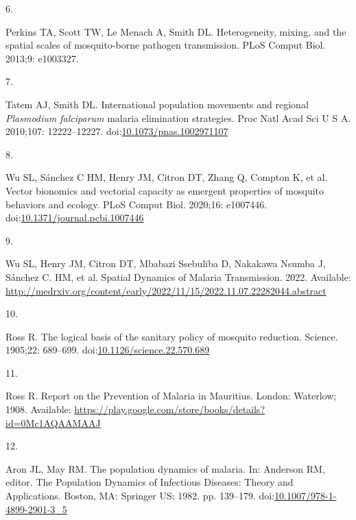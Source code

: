 \documentclass[
]{book}
\newlength{\cslhangindent}
\newlength{\csllabelwidth}
\newlength{\cslentryspacingunit} %
\newenvironment{CSLReferences}[2] %
 {%
  \setlength{\parindent}{0pt}
  \ifodd #1
  \let\oldpar\par
  \def\par{\hangindent=\cslhangindent\oldpar}
  \fi
  \setlength{\parskip}{#2\cslentryspacingunit}
 }%
 {}
\newcommand{\CSLLeftMargin}[1]{\parbox[t]{\csllabelwidth}{#1}}
\newcommand{\CSLRightInline}[1]{\parbox[t]{\linewidth - \csllabelwidth}{#1}\break}
\begin{document}
\begin{CSLReferences}{0}{0}
\leavevmode{}%
\CSLLeftMargin{6. }%
\CSLRightInline{Perkins TA, Scott TW, Le Menach A, Smith DL. Heterogeneity, mixing, and the spatial scales of mosquito-borne pathogen transmission. PLoS Comput Biol. 2013;9: e1003327. }

\leavevmode{}%
\CSLLeftMargin{7. }%
\CSLRightInline{Tatem AJ, Smith DL. International population movements and regional \emph{{Plasmodium} falciparum} malaria elimination strategies. Proc Natl Acad Sci U S A. 2010;107: 12222--12227. doi:\href{https://doi.org/10.1073/pnas.1002971107}{10.1073/pnas.1002971107}}

\leavevmode{}%
\CSLLeftMargin{8. }%
\CSLRightInline{Wu SL, Sánchez C HM, Henry JM, Citron DT, Zhang Q, Compton K, et al. Vector bionomics and vectorial capacity as emergent properties of mosquito behaviors and ecology. PLoS Comput Biol. 2020;16: e1007446. doi:\href{https://doi.org/10.1371/journal.pcbi.1007446}{10.1371/journal.pcbi.1007446}}

\leavevmode{}%
\CSLLeftMargin{9. }%
\CSLRightInline{Wu SL, Henry JM, Citron DT, Mbabazi Ssebuliba D, Nakakawa Nsumba J, Sánchez C. HM, et al. Spatial {Dynamics} of {Malaria} {Transmission}. 2022. Available: \url{http://medrxiv.org/content/early/2022/11/15/2022.11.07.22282044.abstract}}

\leavevmode{}%
\CSLLeftMargin{10. }%
\CSLRightInline{Ross R. The logical basis of the sanitary policy of mosquito reduction. Science. 1905;22: 689--699. doi:\href{https://doi.org/10.1126/science.22.570.689}{10.1126/science.22.570.689}}

\leavevmode{}%
\CSLLeftMargin{11. }%
\CSLRightInline{Ross R. Report on the {Prevention} of {Malaria} in {Mauritius}. London: Waterlow; 1908. Available: \url{https://play.google.com/store/books/details?id=0Mc1AQAAMAAJ}}

\leavevmode{}%
\CSLLeftMargin{12. }%
\CSLRightInline{Aron JL, May RM. The population dynamics of malaria. In: Anderson RM, editor. The {Population} {Dynamics} of {Infectious} {Diseases}: {Theory} and {Applications}. Boston, MA: Springer US; 1982. pp. 139--179. doi:\href{https://doi.org/10.1007/978-1-4899-2901-3_5}{10.1007/978-1-4899-2901-3\_5}}


\end{CSLReferences}
\end{document}
